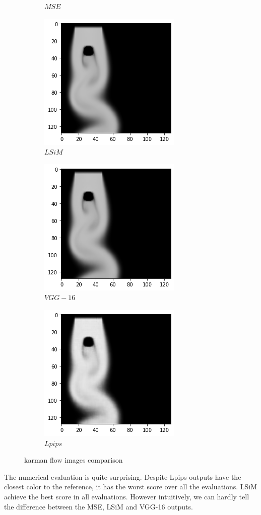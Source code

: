 \documentclass[a4paper,12pt,twoside]{report}
\begin{document}
\begin{figure}
\begin{subfigure}{0.32\textwidth}
		\caption{$MSE$}
	\end{subfigure}
	\begin{subfigure}{0.32\textwidth}
		\centering
		\includegraphics[scale=0.5]{superresolution/karman_lsim.png}
		\caption{$LSiM$}
	\end{subfigure}
	\begin{subfigure}{0.32\textwidth}
		\centering
		\includegraphics[scale=0.5]{superresolution/karman_vgg.png}
		\caption{$VGG-16$}
	\end{subfigure}
	\begin{subfigure}{0.32\textwidth}
		\centering
		\includegraphics[scale=0.5]{superresolution/karman_lpips.png}
		\caption{$Lpips$}
	\end{subfigure}
	\caption{karman flow images comparison}
\end{figure}
The numerical evaluation is quite surprising. Despite Lpips outputs have the closest color to the reference, it has the worst score over all the evaluations. LSiM achieve the best score in all evaluations. However intuitively, we can hardly tell the difference between the MSE, LSiM and VGG-16 outputs.
 
\end{document}
